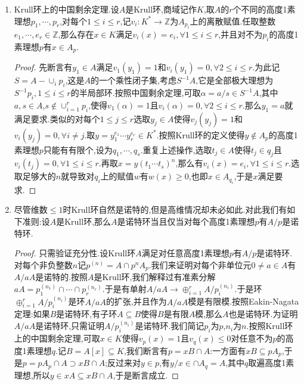 \begin{enumerate}
\begin{proof}
    	这个等价性我们已经证明了大部分内容.唯独需要证明的是如果$A$是1维Krull整环,那么它自动是诺特的.为此我们证明对任意$0\not=a\in A$非单位,有$A/aA$是诺特环.记$aA=q_1\cap\cdots\cap q_r$是不可缩短的准素分解,记$p_i=\sqrt{q_i}$,那么$i\not=j$时有$p_i\not=p_j$.按照$A$是1维整环有每个$p_i$是极大理想.于是对$i\not=j$有$p_i+p_j=R$.于是按照中国剩余定理,有$A/aA\cong\oplus_{i=1}^rA/q_i$.这里$A/q_i$是极大理想为$p_i/q_i$的局部环,于是$A/q_i\cong A_{p_i}/q_iA_{p_i}$是DVR的商环,于是诺特,于是$A/aA\cong\oplus_{i=1}^rA_{p_i}/q_iA_{p_i}$是诺特的.
    \end{proof}
    \item Krull环上的中国剩余定理.设$A$是Krull环,商域记作$K$,取$A$的$r$个不同的高度1素理想$p_1,\cdots,p_r$,对每个$1\le i\le r$,记$v_i:K^*\to\mathbb{Z}$为$A_{p_i}$上的离散赋值.任取整数$e_1,\cdots,e_r\in\mathbb{Z}$,那么存在$x\in K$满足$v_i(x)=e_i,\forall 1\le i\le r$,并且对不为$p_i$的高度1素理想$p$有$x\in A_p$.
    \begin{proof}
    	
    	先断言有$y_1\in A$满足$v_1(y_1)=1$和$v_i(y_1)=0,\forall 2\le i\le r$.为此记$S=A-\cup_ip_i$,这是$A$的一个乘性闭子集,考虑$S^{-1}A$,它是全部极大理想为$S^{-1}p_i,1\le i\le r$的半局部环.按照中国剩余定理,可取$\alpha=a/s\in S^{-1}A$,其中$a,s\in A$,$s\not\in\cup_{i=1}^rp_i$,使得$v_1(\alpha)=1$且$v_i(\alpha)=0,\forall 2\le i\le r$.那么$y_1=a$就满足要求.类似的对每个$1\le j\le r$选取$y_j\in A$使得$v_j(y_j)=1$和$v_i(y_j)=0,\forall i\not=j$.取$y=y_1^{e_1}\cdots y_r^{e_r}\in K^*$.按照Krull环的定义使得$y\not\in A_p$的高度1素理想$p$只能有有限个,设为$q_1,\cdots,q_s$.重复上述操作,选取$t_j\in A$使得$t_j\in q_j$且$v_i(t_j)=0,\forall 1\le i\le r$.再取$x=y(t_1\cdots t_s)^n$,那么有$v_i(x)=e_i,\forall 1\le i\le r$.选取足够大的$n$就导致对$q_i$上的赋值$w$有$w(x)\ge0$,也即$x\in A_{q_i}$,于是$x$满足要求.
    \end{proof}
    \item 尽管维数$\le1$时Krull环自然是诺特的,但是高维情况却未必如此.对此我们有如下准则:设$A$是Krull环,那么$A$是诺特环当且仅当对每个高度1素理想$p$有$A/p$是诺特环.
    \begin{proof}
    	
    	只需验证充分性.设Krull环$A$满足对任意高度1素理想$p$有$A/p$是诺特环.对每个非负整数$n$记$p^{(n)}=A\cap p^nA_p$.我们来证明对每个非单位元$0\not=a\in A$有$A/aA$是诺特的.按照$A$是Krull环,我们解释过有准素分解$aA=p_1^{(n_1)}\cap\cdots\cap p_r^{(n_r)}$.于是有单射$A/aA\to\oplus_{i=1}^rA/p_i^{(n_i)}$.于是环$\oplus_{i=1}^rA/p_i^{(n_i)}$是环$A/aA$的扩张,并且作为$A/aA$模是有限模.按照Eakin-Nagata定理:如果$B$是诺特环,有子环$A\subseteq B$使得$B$是有限$A$模,那么$A$也是诺特环.为证明$A/aA$是诺特环,只需证明$A/p_i^{(n_i)}$是诺特环.我们简记$p_i$为$p$,$n_i$为$n$.按照Krull环上的中国剩余定理,可取$x\in K$使得$v_p(x)=1$且$v_q(x)\le0$对任意不为$p$的高度1素理想$q$.记$B=A[x]\subseteq K$,我们断言有$p=xB\cap A$:一方面有$xB\subseteq pA_p$,于是$p=pA_p\cap A\supset xB\cap A$;反过来对$y\in p$,有$y/x\in\cap A_q=A$,其中$q$取遍高度1素理想,所以$y\in xA\subseteq xB\cap A$,于是断言成立.
    	

\end{proof}
\end{enumerate}
